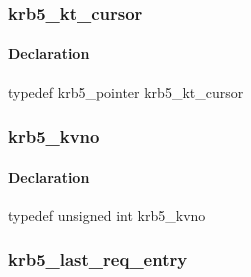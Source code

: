 \documentclass[letterpaper,10pt,english]{sphinxmanual}
\begin{document}
\subsubsection{krb5\_kt\_cursor}
\label{appdev/refs/types/krb5_kt_cursor:krb5-kt-cursor-struct}\label{appdev/refs/types/krb5_kt_cursor::doc}\label{appdev/refs/types/krb5_kt_cursor:krb5-kt-cursor}

\begin{fulllineitems}
\label{appdev/refs/types/krb5_kt_cursor:c.krb5_kt_cursor}
\end{fulllineitems}



\paragraph{Declaration}
\label{appdev/refs/types/krb5_kt_cursor:declaration}
typedef krb5\_pointer krb5\_kt\_cursor


\subsubsection{krb5\_kvno}
\label{appdev/refs/types/krb5_kvno:krb5-kvno}\label{appdev/refs/types/krb5_kvno::doc}\label{appdev/refs/types/krb5_kvno:krb5-kvno-struct}

\begin{fulllineitems}
\label{appdev/refs/types/krb5_kvno:c.krb5_kvno}
\end{fulllineitems}



\paragraph{Declaration}
\label{appdev/refs/types/krb5_kvno:declaration}
typedef unsigned int krb5\_kvno


\subsubsection{krb5\_last\_req\_entry}
\label{appdev/refs/types/krb5_last_req_entry:krb5-last-req-entry}\label{appdev/refs/types/krb5_last_req_entry::doc}\label{appdev/refs/types/krb5_last_req_entry:krb5-last-req-entry-struct}

\begin{fulllineitems}
\label{appdev/refs/types/krb5_last_req_entry:c.krb5_last_req_entry}
\end{fulllineitems}
\end{document}
